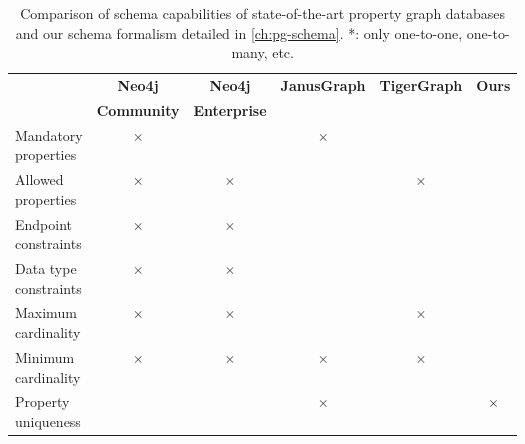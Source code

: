 \documentclass{report}
\theoremstyle{definition}
\newcommand{\yes}{\cellcolor{lightgreen}\color{green}\checkmark}
\newcommand{\no}{\cellcolor{lightred}\color{red}$\times$}
\begin{document}
\begin{table}[t]
  \centering
  \begin{tabular}{lccccc}
    \hline
     & \textbf{Neo4j}     & \textbf{Neo4j}      & \textbf{JanusGraph} & \textbf{TigerGraph} & \textbf{Ours} \\
     & \textbf{Community} & \textbf{Enterprise} &                     &                     &               \\
    \hline
    \makecell{Mandatory                                                                                     \\properties}   & \no                & \yes                & \no                 & \yes                & \yes          \\
    \hline
    \makecell{Allowed                                                                                       \\properties}     & \no                & \no                 & \yes                & \no                 & \yes          \\
    \hline
    \makecell{Endpoint                                                                                      \\constraints}    & \no                & \no                 & \yes                & \yes                & \yes          \\
    \hline
    \makecell{Data type                                                                                     \\constraints}   & \no                & \no                 & \yes                & \yes                & \yes          \\
    \hline
    \makecell{Maximum                                                                                       \\cardinality}     & \no                & \no                 & \yes*               & \no                 & \yes          \\
    \hline
    \makecell{Minimum                                                                                       \\cardinality}     & \no                & \no                 & \no                 & \no                 & \yes          \\
    \hline
    \makecell{Property                                                                                      \\uniqueness}    & \yes               & \yes                & \no                 & \yes                & \no           \\
    \hline
  \end{tabular}
  \caption[Comparison of schema capabilities of state-of-the-art property graph databases and our schema formalism]{Comparison of schema capabilities of state-of-the-art property graph databases and our schema formalism detailed in \autoref{ch:pg-schema}. *: only one-to-one, one-to-many, etc.}
  \label{tab:schema-comparison}
\end{table}
\end{document}
